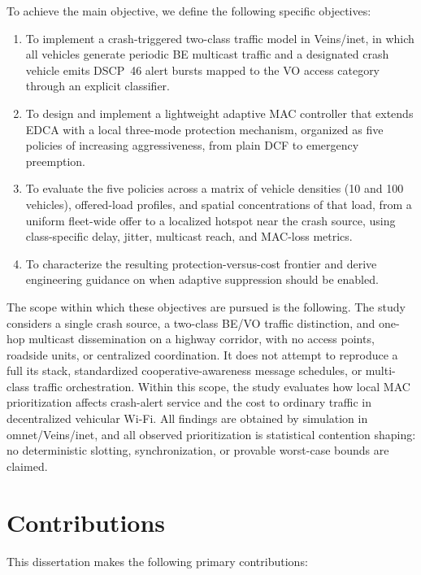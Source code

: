 To achieve the main objective, we define the following specific objectives:

\begin{enumerate}
	\item To implement a crash-triggered two-class traffic model in Veins/\gls{inet}, in which all vehicles generate periodic BE multicast traffic and a designated crash vehicle emits DSCP~46 alert bursts mapped to the VO access category through an explicit classifier.
	\item To design and implement a lightweight adaptive MAC controller that extends EDCA with a local three-mode protection mechanism, organized as five policies of increasing aggressiveness, from plain DCF to emergency preemption.
	\item To evaluate the five policies across a matrix of vehicle densities (10 and 100 vehicles), offered-load profiles, and spatial concentrations of that load, from a uniform fleet-wide offer to a localized hotspot near the crash source, using class-specific delay, jitter, multicast reach, and MAC-loss metrics.
	\item To characterize the resulting protection-versus-cost frontier and derive engineering guidance on when adaptive suppression should be enabled.
\end{enumerate}

The scope within which these objectives are pursued is the following.
The study considers a single crash source, a two-class BE/VO traffic distinction, and one-hop multicast dissemination on a highway corridor, with no access points, roadside units, or centralized coordination. It does not attempt to reproduce a full \gls{its} stack, standardized cooperative-awareness message schedules, or multi-class traffic orchestration. Within this scope, the study evaluates how local MAC prioritization affects crash-alert service and the cost to ordinary traffic in decentralized vehicular Wi-Fi. All findings are obtained by simulation in \gls{omnet}/Veins/\gls{inet}, and all observed prioritization is statistical contention shaping: no deterministic slotting, synchronization, or provable worst-case bounds are claimed.

\section{Contributions}
\label{sec:intro:contributions}

This dissertation makes the following primary contributions:


